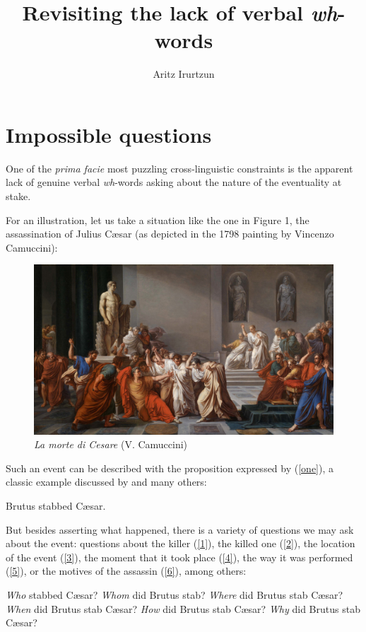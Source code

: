\documentclass[output=paper]{langsci/langscibook}
\author{Aritz Irurtzun\affiliation{CNRS-IKER (UMR 5478)}}
\title{Revisiting the lack of verbal \textit{wh}-words}
\begin{document}
\glsresetall

\section{Impossible questions}

One of the \emph{prima facie} most puzzling cross-linguistic constraints is the
apparent lack of genuine verbal \emph{wh}-words asking about the nature of the
eventuality at stake.

For an illustration, let us take a situation like the one in Figure 1, the
assassination of Julius C\ae{}sar (as depicted in the 1798 painting by Vincenzo
Camuccini):

\begin{figure}[H]
\centering
\includegraphics[scale=0.1,keepaspectratio=true]{./img/15.png}
\caption{\emph{La morte di Cesare} (V. Camuccini)}
\end{figure}

Such an event can be described with the proposition expressed by (\ref{one}), a
classic example discussed by \citet{Davidson1967} and many others:

\begin{exe}
\ex \label{one} Brutus stabbed C\ae{}sar.
\end{exe}

But besides asserting what happened, there is a variety of questions we may ask
about the event: questions about the killer (\ref{1}), the killed one
(\ref{2}), the location of the event (\ref{3}), the moment that it took place
(\ref{4}), the way it was performed (\ref{5}), or the motives of the assassin
(\ref{6}), among others:

\begin{exe}
\ex \label{1} \emph{Who} stabbed C\ae{}sar?
\ex \label{2} \emph{Whom} did Brutus stab?
\ex \label{3} \emph{Where} did Brutus stab C\ae{}sar?
\ex \label{4} \emph{When} did Brutus stab C\ae{}sar?
\ex \label{5} \emph{How} did Brutus stab C\ae{}sar?
\ex \label{6} \emph{Why} did Brutus stab C\ae{}sar?
\end{exe}
\end{document}
